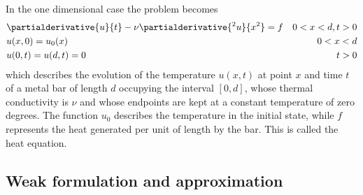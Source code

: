 In the one dimensional case the problem becomes 
\begin{equation}
    \begin{aligned}
        &\partialderivative{u}{t} - \nu \partialderivative{^2u}{x^2} = f & 0 < x <d, t> 0 \\
        &u(x,0) = u_0(x) & 0 < x < d \\
        & u(0,t) = u(d,t) = 0 & t>0
    \end{aligned}
    \label{one_dim_pbl}
\end{equation}
which describes the evolution of the temperature \(u(x,t)\) at point \(x\) and time \(t\) of a metal bar of length \(d\) occupying the interval \([0,d]\), whose thermal conductivity is \(\nu\) and whose endpoints are kept at a constant temperature of zero degrees. The function \(u_0\) describes the temperature in the initial state, while \(f\) represents the heat generated per unit of length by the bar. This is called the heat equation.
\subsection{Weak formulation and approximation}
